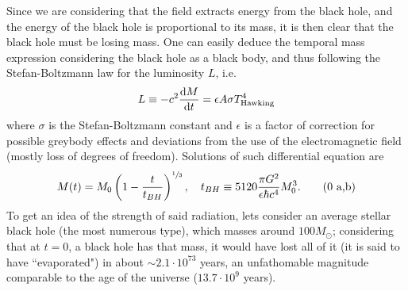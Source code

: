 Since we are considering that the field extracts energy from the black hole, and the energy of the black hole is proportional to its mass, it is then clear that the black hole must be losing mass. One can easily deduce the temporal mass expression considering the black hole as a black body, and thus following the Stefan-Boltzmann law for the luminosity $L$, i.e.
\begin{equation}
	L\equiv-c^2\frac{\text{d} M}{\text{d} t}=\epsilon A \sigma T^4_{\text{Hawking}}
\end{equation}
where $\sigma$ is the Stefan-Boltzmann constant and $\epsilon$ is a factor of correction for possible greybody effects and deviations from the use of the electromagnetic field (mostly loss of degrees of freedom). Solutions of such differential equation are
\begin{subequations}
	\begin{gather}
		M(t)=M_0\left(1-\frac{t}{t_{BH}}\right)^{\sfrac{1}{3}},\quad t_{BH}\equiv 5120\frac{\pi G^2}{\epsilon\hbar c^4}M_0^3.\tag{\theequation \,\,a,b}
	\end{gather}
\end{subequations}
To get an idea of the strength of said radiation, lets consider an average stellar black hole (the most numerous type), which masses around $100M_\odot$; considering that at $t=0$, a black hole has that mass, it would have lost all of it (it is said to have ``evaporated") in about $\sim 2.1\cdot10^{73}$ years, an unfathomable magnitude comparable to the age of the universe ($13.7\cdot 10^{9}$ years).
